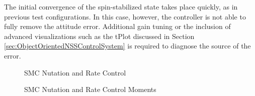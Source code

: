 The initial convergence of the spin-stabilized state takes place quickly, as in previous test configurations.  In this case, however, the controller is not able to fully remove the attitude error.  Additional gain tuning or the inclusion of advanced visualizations such as the tPlot discussed in Section \ref{sec:ObjectOrientedNSSControlSystem} is required to diagnose the source of the error.
\begin{figure}[H]
  \centerline{}
  \caption{SMC Nutation and Rate Control}
  \label{fig:SMCNutationAndRateControl}
\end{figure}
\begin{figure}[H]
  \centerline{}
  \caption{SMC Nutation and Rate Control Moments}
  \label{fig:SMCNutationAndRateControlMoments}
\end{figure}
